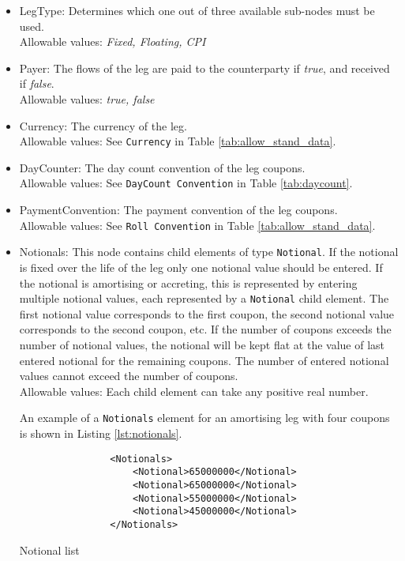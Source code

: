 \begin{itemize}
\item LegType:  Determines which one out of three available sub-nodes must be used. \\ Allowable values:  \emph{Fixed, Floating, CPI}
\item Payer:  The flows of the leg are paid to the counterparty if \emph{true}, and received if \emph{false}.  \\ Allowable values:  \emph{true, false} 
\item Currency: The currency of the leg. \\ Allowable values:  See \lstinline!Currency! in Table \ref{tab:allow_stand_data}.
\item DayCounter: The day count convention of the leg coupons. \\Allowable values: See \lstinline!DayCount Convention! in Table \ref{tab:daycount}.
\item PaymentConvention: The payment convention of the leg coupons. \\Allowable values: See \lstinline!Roll Convention! in Table \ref{tab:allow_stand_data}.

\item Notionals: This node contains child elements of type \lstinline!Notional!. If the notional is fixed over the life of the leg only one notional value should be entered. If the notional is amortising or accreting, this is represented by entering multiple notional values, each represented by a \lstinline!Notional! child element. The first notional value corresponds to the first coupon, the second notional value corresponds to the second coupon, etc. If the number of coupons exceeds the number of notional values, the notional will be kept flat at the value of last entered notional for the remaining coupons.  The number of entered notional values cannot exceed the number of coupons. \\Allowable values: Each child element can take any positive real number.

\vspace{1em}

An example of a \lstinline!Notionals! element for an amortising leg with four coupons is shown in Listing \ref{lst:notionals}.
\begin{listing}[H]
\begin{verbatim}
                <Notionals>
                    <Notional>65000000</Notional>
                    <Notional>65000000</Notional>
                    <Notional>55000000</Notional>
                    <Notional>45000000</Notional>
                </Notionals>
\end{verbatim}
\caption{Notional list}
\label{lst:notionals}
\end{listing}


\end{itemize}
